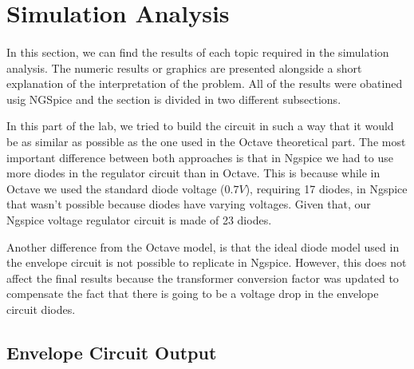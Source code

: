 \section{Simulation Analysis}
\label{sec:simulation}

\paragraph{}
In this section, we can find the results of each topic required in the simulation analysis. The numeric results or graphics are presented alongside a short explanation of the interpretation of the problem. All of the results were obatined usig NGSpice and the section is divided in two different subsections. 

In this part of the lab, we tried to build the circuit in such a way that it would be as similar as possible as the one used in the Octave theoretical part. The most important difference between both approaches is that in Ngspice we had to use more diodes in the regulator circuit than in Octave. This is because while in Octave we used the standard diode voltage ($0.7 V$), requiring 17 diodes, in Ngspice that wasn't possible because diodes have varying voltages. Given that, our Ngspice voltage regulator circuit is made of 23 diodes.

Another difference from the Octave model, is that the ideal diode model used in the envelope circuit is not possible to replicate in Ngspice. However, this does not affect the final results because the transformer conversion factor was updated to compensate the fact that there is going to be a voltage drop in the envelope circuit diodes.

\subsection{Envelope Circuit Output}

